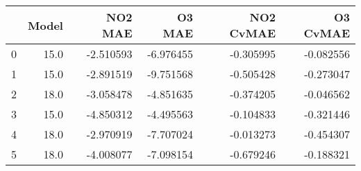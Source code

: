 \begin{tabular}{lrrrrr}
\toprule
{} &  Model &   NO2 MAE &    O3 MAE &  NO2 CvMAE &  O3 CvMAE \\
\midrule
0 &   15.0 & -2.510593 & -6.976455 &  -0.305995 & -0.082556 \\
1 &   15.0 & -2.891519 & -9.751568 &  -0.505428 & -0.273047 \\
2 &   18.0 & -3.058478 & -4.851635 &  -0.374205 & -0.046562 \\
3 &   15.0 & -4.850312 & -4.495563 &  -0.104833 & -0.321446 \\
4 &   18.0 & -2.970919 & -7.707024 &  -0.013273 & -0.454307 \\
5 &   18.0 & -4.008077 & -7.098154 &  -0.679246 & -0.188321 \\
\bottomrule
\end{tabular}
